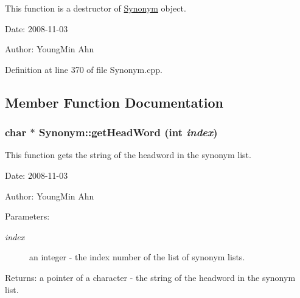 This function is a destructor of \hyperlink{classkmaOrange_1_1Synonym}{Synonym} object. 

\begin{Desc}
\item[Date:]2008-11-03 \end{Desc}
\begin{Desc}
\item[Author:]YoungMin Ahn \end{Desc}


Definition at line 370 of file Synonym.cpp.

\subsection{Member Function Documentation}
\hypertarget{classkmaOrange_1_1Synonym_c15a3ecb61bc07409975df19fee47f6d}{
\subsubsection[{getHeadWord}]{\setlength{\rightskip}{0pt plus 5cm}char $\ast$ Synonym::getHeadWord (int {\em index})}}
\label{classkmaOrange_1_1Synonym_c15a3ecb61bc07409975df19fee47f6d}


This function gets the string of the headword in the synonym list. 

\begin{Desc}
\item[Date:]2008-11-03 \end{Desc}
\begin{Desc}
\item[Author:]YoungMin Ahn \end{Desc}
\begin{Desc}
\item[Parameters:]
\begin{description}
\item[{\em index}]an integer - the index number of the list of synonym lists. \end{description}
\end{Desc}
\begin{Desc}
\item[Returns:]a pointer of a character - the string of the headword in the synonym list. \end{Desc}


